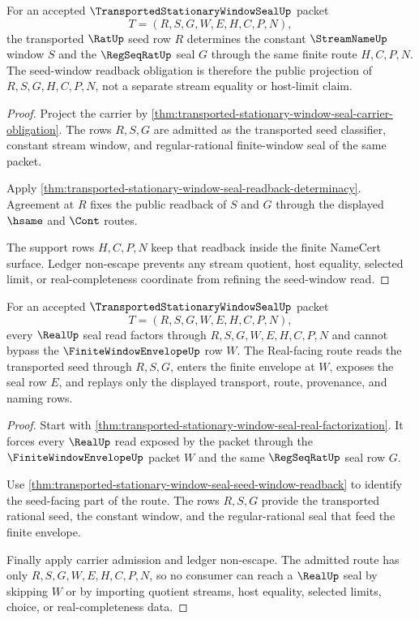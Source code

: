 \begin{theorem}
\label{thm:transported-stationary-window-seal-seed-window-readback}
For an accepted $\TransportedStationaryWindowSealUp$ packet
$$
T=(R,S,G,W,E,H,C,P,N),
$$
the transported $\RatUp$ seed row $R$ determines the constant $\StreamNameUp$ window $S$ and the $\RegSeqRatUp$ seal $G$ through the same finite route $H,C,P,N$. The seed-window readback obligation is therefore the public projection of $R,S,G,H,C,P,N$, not a separate stream equality or host-limit claim.
\end{theorem}
\begin{proof}
Project the carrier by \autoref{thm:transported-stationary-window-seal-carrier-obligation}. The rows $R,S,G$ are admitted as the transported seed classifier, constant stream window, and regular-rational finite-window seal of the same packet.

Apply \autoref{thm:transported-stationary-window-seal-readback-determinacy}. Agreement at $R$ fixes the public readback of $S$ and $G$ through the displayed $\hsame$ and $\Cont$ routes.

The support rows $H,C,P,N$ keep that readback inside the finite NameCert surface. Ledger non-escape prevents any stream quotient, host equality, selected limit, or real-completeness coordinate from refining the seed-window read.
\end{proof}

\begin{theorem}
\label{thm:transported-stationary-window-seal-real-seal-route}
For an accepted $\TransportedStationaryWindowSealUp$ packet
$$
T=(R,S,G,W,E,H,C,P,N),
$$
every $\RealUp$ seal read factors through $R,S,G,W,E,H,C,P,N$ and cannot bypass the $\FiniteWindowEnvelopeUp$ row $W$. The Real-facing route reads the transported seed through $R,S,G$, enters the finite envelope at $W$, exposes the seal row $E$, and replays only the displayed transport, route, provenance, and naming rows.
\end{theorem}
\begin{proof}
Start with \autoref{thm:transported-stationary-window-seal-real-factorization}. It forces every $\RealUp$ read exposed by the packet through the $\FiniteWindowEnvelopeUp$ packet $W$ and the same $\RegSeqRatUp$ seal row $G$.

Use \autoref{thm:transported-stationary-window-seal-seed-window-readback} to identify the seed-facing part of the route. The rows $R,S,G$ provide the transported rational seed, the constant window, and the regular-rational seal that feed the finite envelope.

Finally apply carrier admission and ledger non-escape. The admitted route has only $R,S,G,W,E,H,C,P,N$, so no consumer can reach a $\RealUp$ seal by skipping $W$ or by importing quotient streams, host equality, selected limits, choice, or real-completeness data.
\end{proof}

